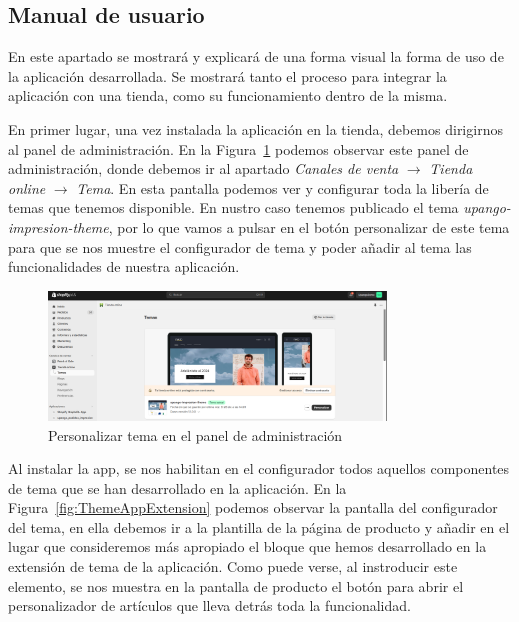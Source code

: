 \documentclass[12pt]{article}
\begin{document}
\subsection{Manual de usuario}
En este apartado se mostrará y explicará de una forma visual la forma de uso de la aplicación desarrollada. Se mostrará tanto el proceso para integrar la aplicación con una tienda, como
su funcionamiento dentro de la misma.

En primer lugar, una vez instalada la aplicación en la tienda, debemos dirigirnos al panel de administración. En la Figura~\ref{fig:PersonalizarTema} podemos observar este panel de administración, donde
debemos ir al apartado \textit{Canales de venta} $\rightarrow$  \textit{Tienda online} $\rightarrow$  \textit{Tema}. En esta pantalla podemos ver y configurar toda la libería de temas que tenemos disponible.
En nustro caso tenemos publicado el tema \textit{upango-impresion-theme}, por lo que vamos a pulsar en el botón personalizar de este tema para que se nos muestre el configurador de tema y poder
añadir al tema las funcionalidades de nuestra aplicación.

\begin{figure}[ht]
    \centering
    \includegraphics[width=0.8\textwidth]{imagenes/ManualUsuario/PantallaDePersonalizarTema.png}
    \caption{\label{fig:PersonalizarTema}Personalizar tema en el panel de administración}
    \vspace{\fill}
\end{figure}

Al instalar la app, se nos habilitan en el configurador todos aquellos componentes de tema que se han desarrollado en la aplicación.
En la Figura~\ref{fig:ThemeAppExtension} podemos observar la pantalla del configurador del tema, en ella debemos ir a la plantilla de la página de producto y añadir
en el lugar que consideremos más apropiado el bloque que hemos desarrollado en la extensión de tema de la aplicación. Como puede verse, al instroducir este elemento, se nos muestra en la pantalla de producto
el botón para abrir el personalizador de artículos que lleva detrás toda la funcionalidad.
\end{document}

